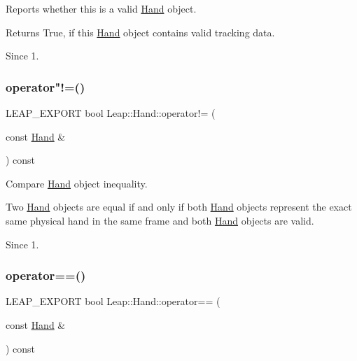 Reports whether this is a valid \hyperlink{class_leap_1_1_hand}{Hand} object.


\begin{DoxyCodeInclude}
\end{DoxyCodeInclude}


\begin{DoxyReturn}{Returns}
True, if this \hyperlink{class_leap_1_1_hand}{Hand} object contains valid tracking data. 
\end{DoxyReturn}
\begin{DoxySince}{Since}
1. 
\end{DoxySince}
\mbox{\label{class_leap_1_1_hand_ae837a29788bd93824e3de029eb67ce02}} 
\subsubsection{\texorpdfstring{operator"!=()}{operator!=()}}
{\footnotesize\ttfamily L\+E\+A\+P\+\_\+\+E\+X\+P\+O\+RT bool Leap\+::\+Hand\+::operator!= (\begin{DoxyParamCaption}\item[{const \hyperlink{class_leap_1_1_hand}{Hand} \&}]{ }\end{DoxyParamCaption}) const}

Compare \hyperlink{class_leap_1_1_hand}{Hand} object inequality.


\begin{DoxyCodeInclude}
\end{DoxyCodeInclude}


Two \hyperlink{class_leap_1_1_hand}{Hand} objects are equal if and only if both \hyperlink{class_leap_1_1_hand}{Hand} objects represent the exact same physical hand in the same frame and both \hyperlink{class_leap_1_1_hand}{Hand} objects are valid. \begin{DoxySince}{Since}
1. 
\end{DoxySince}
\mbox{\label{class_leap_1_1_hand_a90a005182d02abd6ffef181d7d64f4a4}} 
\subsubsection{\texorpdfstring{operator==()}{operator==()}}
{\footnotesize\ttfamily L\+E\+A\+P\+\_\+\+E\+X\+P\+O\+RT bool Leap\+::\+Hand\+::operator== (\begin{DoxyParamCaption}\item[{const \hyperlink{class_leap_1_1_hand}{Hand} \&}]{ }\end{DoxyParamCaption}) const}

